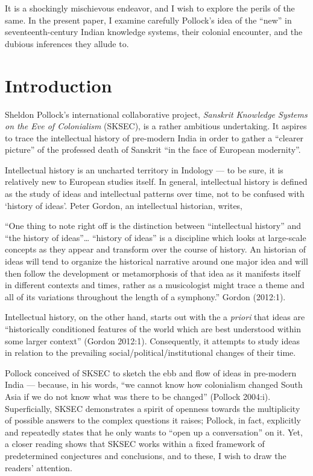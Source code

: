It is a shockingly mischievous endeavor, and I wish to explore the perils of the same.  In the present paper, I examine carefully Pollock’s idea of the “new” in seventeenth-century Indian knowledge systems, their colonial encounter, and the dubious inferences they allude to.  

\section*{Introduction}

Sheldon Pollock’s international collaborative project, {\sl Sanskrit Knowledge Systems on the Eve of Colonialism} (SKSEC), is a rather ambitious undertaking. It aspires to trace the intellectual history of pre-modern India in order to gather a “clearer picture” of the professed death of Sanskrit “in the face of European modernity”. 

Intellectual history is an uncharted territory in Indology — to be sure, it is relatively new to European studies itself. In general, intellectual history is defined as the study of ideas and intellectual patterns over time, not to be confused with ‘history of ideas’. Peter Gordon, an intellectual historian, writes, 
\begin{myquote}
“One thing to note right off is the distinction between “intellectual history” and “the history of ideas”… “history of ideas” is a discipline which looks at large-scale concepts as they appear and transform over the course of history. An historian of ideas will tend to organize the historical narrative around one major idea and will then follow the development or metamorphosis of that idea as it manifests itself in different contexts and times, rather as a musicologist might trace a theme and all of its variations throughout the length of a symphony.” \hfill{Gordon (2012:1).}
\end{myquote}

Intellectual history, on the other hand, starts out with the a {\sl priori} that ideas are “historically conditioned features of the world which are best understood within some larger context”  (Gordon 2012:1). Consequently, it attempts to study ideas in relation to the prevailing social/political/institutional changes of their time. 

Pollock conceived of SKSEC to sketch the ebb and flow of ideas in pre-modern India — because, in his words, “we cannot know how colonialism changed South Asia if we do not know what was there to be changed” (Pollock 2004:i). Superficially, SKSEC demonstrates a spirit of openness towards the multiplicity of possible answers to the complex questions it raises; Pollock, in fact, explicitly and repeatedly states that he only wants to “open up a conversation” on it. Yet, a closer reading shows that SKSEC works within a fixed framework of predetermined conjectures and conclusions, and to these, I wish to draw the readers’ attention. 

